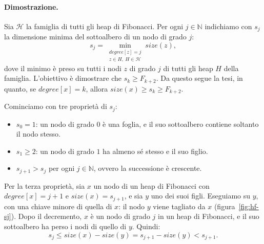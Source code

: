 \paragraph{Dimostrazione.}
Sia $\mathcal{H}$ la famiglia di tutti gli heap di Fibonacci. Per ogni $j \in \mathbb{N}$ indichiamo con $s_j$ la dimensione minima del sottoalbero di un nodo di grado $j$:
\[
s_j = \min_{\substack{\mathit{degree}[z] = j\\ z \in H,\ H \in \mathcal{H}}} \mathit{size}(z),
\]
dove il minimo è preso su tutti i nodi $z$ di grado $j$ di tutti gli heap $H$ della famiglia. L'obiettivo è dimostrare che $s_k \ge F_{k+2}$. Da questo segue la tesi, in quanto, se $\mathit{degree}[x] = k$, allora $\mathit{size}(x) \ge s_k \ge F_{k+2}$.

Cominciamo con tre proprietà di $s_j$:
\begin{itemize}
    \item $s_0 = 1$: un nodo di grado $0$ è una foglia, e il suo sottoalbero contiene soltanto il nodo stesso.
    \item $s_1 \ge 2$: un nodo di grado $1$ ha almeno sé stesso e il suo figlio.
    \item $s_{j+1} > s_j$ per ogni $j \in \mathbb{N}$, ovvero la successione è crescente.
\end{itemize}

Per la terza proprietà, sia $x$ un nodo di un heap di Fibonacci con $\mathit{degree}[x] = j+1$ e $\mathit{size}(x) = s_{j+1}$, e sia $y$ uno dei suoi figli. Eseguiamo \FibHeapDecreaseKey{} su $y$, con una chiave minore di quella di $x$: il nodo $y$ viene tagliato da $x$ (figura~\ref{fig:hf-sj}). Dopo il decremento, $x$ è un nodo di grado $j$ in un heap di Fibonacci, e il suo sottoalbero ha perso i nodi di quello di $y$. Quindi:
\[
s_j \le \mathit{size}(x) - \mathit{size}(y) = s_{j+1} - \mathit{size}(y) < s_{j+1}.
\]

